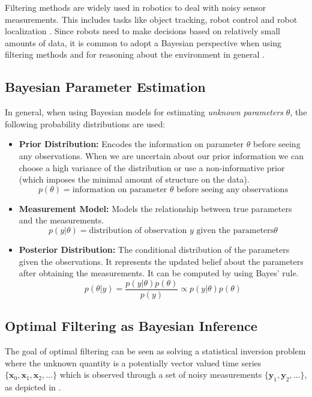 Filtering methods are widely used in robotics
to deal with noisy sensor measurements. This
includes tasks like object tracking, robot control and
robot localization \citep{chen2011kalman}.
Since robots need to make decisions based on relatively small amounts
of data, it is common to adopt a Bayesian perspective when
using filtering methods and for 
reasoning about the environment in general \citep{thrun2002probabilistic}.

\subsection{Bayesian Parameter Estimation}
In general, when using Bayesian models for estimating
\textit{unknown parameters} $\theta$, the following probability distributions
are used:

\begin{itemize}
\item \textbf{Prior Distribution:}
Encodes the information on parameter $\theta$ before seeing any
observations. When we are uncertain about our prior information
we can choose a high variance of the distribution or use a
non-informative prior (which imposes the minimal amount of structure
on the data).
$$ p(\theta) = \text{information on parameter } \theta
\text{ before seeing any observations} $$

\item \textbf{Measurement Model:}
Models the relationship between true parameters and the measurements.
$$ p(y | \theta) = \text{distribution of observation } y
\text{ given the parameters} \theta $$

\item \textbf{Posterior Distribution:}
The conditional distribution of the parameters given the observations.
It represents the updated belief about the parameters
after obtaining the measurements. It can be computed by using Bayes' rule.
$$ p(\theta | y) = \frac{p(y | \theta) p(\theta)}{p(y)}
\propto p(y | \theta) p(\theta) $$
\end{itemize}

\subsection{Optimal Filtering as Bayesian Inference}
The goal of optimal filtering can be seen as solving a statistical
inversion problem where
the unknown quantity is a potentially vector valued
time series $\{\mathbf{x}_0, \mathbf{x}_1, \mathbf{x}_2,...\}$ which
is observed through a set of noisy measurements
$\{\mathbf{y}_1, \mathbf{y}_2,...\}$, as depicted in .

